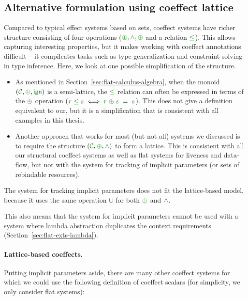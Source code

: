 
\subsection{Alternative formulation using coeffect lattice}
\label{sec:unified-impl-semilattice}

Compared to typical effect systems based on sets, coeffect systems have richer structure consisting
of four operations ($\cseq,\czip,\cpar$ and a relation $\cleq$). This allows capturing interesting 
properties, but it makes working with coeffect annotations difficult -- it compilcates tasks
such as type generalization and constraint solving in type inference. Here, we look at one possible 
simplification of the structure.

\begin{itemize}
\item As mentioned in Section~\ref{sec:flat-calculus-algebra}, when the monoid $(\C,\cpar,\czero)$ is a
semi-lattice, the $\cleq$ relation can often be expressed in terms of the $\cpar$ operation 
($\cclrd{r} \;\cleq\; \cclrd{s} \;\Longleftrightarrow\; \cclrd{r} \;\cpar\; \cclrd{s} \;=\; \cclrd{s}$).
This does not give a definition equivalent to our, but it is a simplification that is consistent 
with all examples in this thesis.

\item Another approach that works for most (but not all) systems we discussed is to require the structure
$(\C,\cpar,\czip)$ to form a lattice. This is consistent with all our structural coeffect systems as
well as flat systems for liveness and data-flow, but not with the system for tracking of implicit
parameters (or sets of rebindable resources).
\end{itemize}

\noindent
The system for tracking implicit parameters does not fit the lattice-based model, because it uses the 
same operation $\cup$ for both $\cpar$ and $\czip$. 

This also means that the system for implicit parameters cannot be used with a system where lambda 
abstraction duplicates the context requirements (Section~\ref{sec:flat-exts-lambda}). 

\paragraph{Lattice-based coeffects.} Putting implicit parameters aside, there are many other coeffect
systems for which we could use the following definition of coeffect scalars (for simplicity, we only 
consider flat systems):

